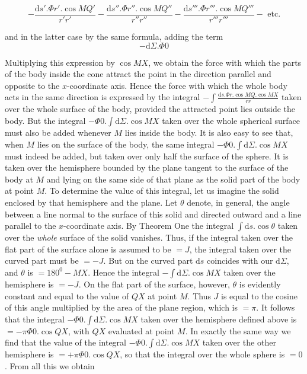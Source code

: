 \[
-\frac{\mathrm{d}s'.\Phi r'.\cos MQ'}{r'r'}-\frac{\mathrm{d}s''.\Phi r''.\cos MQ''}{r''r''}-\frac{\mathrm{d}s'''.\Phi r'''.\cos MQ'''}{r'''r'''}-\text{ etc.}
\]
\par
and in the latter case by the same formula, adding the term
\[
-\mathrm{d}\Sigma.\Phi0
\]
\par
Multiplying this expression by $\cos MX$, we obtain the force with which the parts of the body inside the cone attract the point in the direction parallel and opposite to the $x$-coordinate axis. Hence the force with which the whole body acts in the same direction is expressed by the integral $-\int\frac{\mathrm{d}s.\Phi r.\cos MQ.\cos MX}{rr}$ taken over the whole surface of the body, provided the attracted point lies outside the body. But the integral $-\Phi0.\int\mathrm{d}\Sigma.\cos MX$ taken over the whole spherical surface must also be added whenever $M$ lies inside the body. It is also easy to see that, when $M$ lies on the surface of the body, the same integral $-\Phi0.\int\mathrm{d}\Sigma.\cos MX$ must indeed be added, but taken over only half the surface of the sphere. It is taken over the hemisphere bounded by the plane tangent to the surface of the body at $M$ and lying on the same side of that plane as the solid part of the body at point $M$. To determine the value of this integral, let us imagine the solid enclosed by that hemisphere and the plane. Let $\theta$ denote, in general, the angle between a line normal to the surface of this solid and directed outward and a line parallel to the $x$-coordinate axis. By Theorem One the integral $\int\mathrm{d}s.\cos\theta$ taken over the \textit{whole} surface of the solid vanishes. Thus, if the integral taken over the flat part of the surface alone is assumed to be $=J$, the integral taken over the curved part must be $=-J$. But on the curved part $\mathrm{d}s$ coincides with our $\mathrm{d}\Sigma$, and $\theta$ is $=180^0-MX$. Hence the integral $-\int\mathrm{d}\Sigma.\cos MX$ taken over the hemisphere is $=-J$. On the flat part of the surface, however, $\theta$ is evidently constant and equal to the value of $QX$ at point $M$. Thus $J$ is equal to the cosine of this angle multiplied by the area of the plane region, which is $=\pi$. It follows that the integral $-\Phi0.\int\mathrm{d}\Sigma.\cos MX$ taken over the hemisphere defined above is $=-\pi\Phi0.\cos QX$, with $QX$ evaluated at point $M$. In exactly the same way we find that the value of the integral $-\Phi0.\int\mathrm{d}\Sigma.\cos MX$ taken over the other hemisphere is $=+\pi\Phi0.\cos QX$, so that the integral over the whole sphere is $=0$. From all this we obtain
